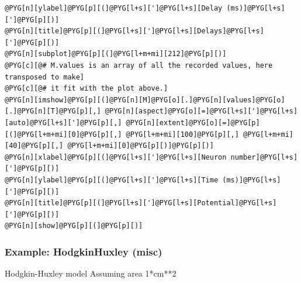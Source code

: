 \documentclass[letterpaper,10pt,english]{manual}
\begin{document}
\begin{Verbatim}[commandchars=@\[\]]
@PYG[n][ylabel]@PYG[p][(]@PYG[l+s][']@PYG[l+s][Delay (ms)]@PYG[l+s][']@PYG[p][)]
@PYG[n][title]@PYG[p][(]@PYG[l+s][']@PYG[l+s][Delays]@PYG[l+s][']@PYG[p][)]
@PYG[n][subplot]@PYG[p][(]@PYG[l+m+mi][212]@PYG[p][)]
@PYG[c][@# M.values is an array of all the recorded values, here transposed to make]
@PYG[c][@# it fit with the plot above.]
@PYG[n][imshow]@PYG[p][(]@PYG[n][M]@PYG[o][.]@PYG[n][values]@PYG[o][.]@PYG[n][T]@PYG[p][,] @PYG[n][aspect]@PYG[o][=]@PYG[l+s][']@PYG[l+s][auto]@PYG[l+s][']@PYG[p][,] @PYG[n][extent]@PYG[o][=]@PYG[p][(]@PYG[l+m+mi][0]@PYG[p][,] @PYG[l+m+mi][100]@PYG[p][,] @PYG[l+m+mi][40]@PYG[p][,] @PYG[l+m+mi][0]@PYG[p][)]@PYG[p][)]
@PYG[n][xlabel]@PYG[p][(]@PYG[l+s][']@PYG[l+s][Neuron number]@PYG[l+s][']@PYG[p][)]
@PYG[n][ylabel]@PYG[p][(]@PYG[l+s][']@PYG[l+s][Time (ms)]@PYG[l+s][']@PYG[p][)]
@PYG[n][title]@PYG[p][(]@PYG[l+s][']@PYG[l+s][Potential]@PYG[l+s][']@PYG[p][)]
@PYG[n][show]@PYG[p][(]@PYG[p][)]
\end{Verbatim}

\resetcurrentobjects
\hypertarget{--doc-examples-misc_HodgkinHuxley}{}

\hypertarget{index-38}{}\subsubsection{Example: HodgkinHuxley (misc)}

Hodgkin-Huxley model
Assuming area 1*cm**2
\end{document}
